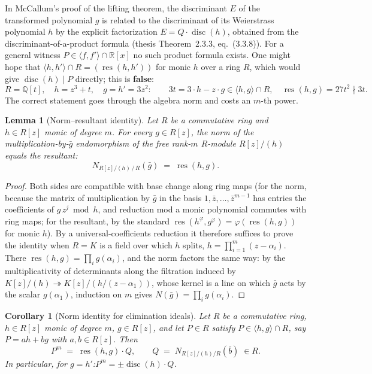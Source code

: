 \documentclass[11pt,a4paper]{article}
\theoremstyle{plain}
\newtheorem{lemma}[theorem]{Lemma}
\newtheorem{corollary}[theorem]{Corollary}
\theoremstyle{definition}
\newcommand{\R}{\mathbb{R}}
\DeclareMathOperator{\res}{res}
\DeclareMathOperator{\disc}{disc}
\newcommand{\ideal}[1]{\langle #1\rangle}
\begin{document}
In McCallum's proof of the lifting theorem, the discriminant $E$ of the
transformed polynomial $g$ is related to the discriminant of its Weierstrass
polynomial $h$ by the explicit factorization $E=Q\cdot\disc(h)$, obtained from
the discriminant-of-a-product formula (thesis Theorem~2.3.3, eq.~(3.3.8)). For
a general witness $P\in\ideal{f,f'}\cap\R[x]$ no such product formula exists.
One might hope that $\ideal{h,h'}\cap R=(\res(h,h'))$ for monic $h$ over a
ring $R$, which would give $\disc(h)\mid P$ directly; this is \textbf{false}:
\begin{equation}\label{eq:counterexample}
  R=\mathbb{Q}[t],\quad h=z^3+t,\quad g=h'=3z^2:\qquad
  3t = 3\cdot h - z\cdot g\in\ideal{h,g}\cap R,\quad
  \res(h,g)=27t^2\nmid 3t .
\end{equation}
The correct statement goes through the algebra norm and costs an $m$-th power.

\begin{lemma}[Norm--resultant identity]\label{lem:norm-res}
Let $R$ be a commutative ring and $h\in R[z]$ monic of degree $m$. For every
$g\in R[z]$, the norm of the multiplication-by-$\bar g$ endomorphism of the
free rank-$m$ $R$-module $R[z]/(h)$ equals the resultant:
\[
  N_{R[z]/(h)\,/\,R}(\bar g)\;=\;\res(h,g).
\]
\end{lemma}

\begin{proof}
Both sides are compatible with base change along ring maps (for the norm,
because the matrix of multiplication by $\bar g$ in the basis
$1,\bar z,\dots,\bar z^{m-1}$ has entries the coefficients of
$g\,z^j \bmod h$, and reduction mod a monic polynomial commutes with ring
maps; for the resultant, by the standard $\res(h^\varphi,g^\varphi)
=\varphi(\res(h,g))$ for monic $h$). By a universal-coefficients reduction it
therefore suffices to prove the identity when $R=K$ is a field over which $h$
splits, $h=\prod_{i=1}^m(z-\alpha_i)$. There
$\res(h,g)=\prod_i g(\alpha_i)$, and the norm factors the same way: by the
multiplicativity of determinants along the filtration induced by
$K[z]/(h)\twoheadrightarrow K[z]/(h/(z-\alpha_1))$, whose kernel is a line on
which $\bar g$ acts by the scalar $g(\alpha_1)$, induction on $m$ gives
$N(\bar g)=\prod_i g(\alpha_i)$.
\end{proof}

\begin{corollary}[Norm identity for elimination ideals]\label{cor:norm-elim}
Let $R$ be a commutative ring, $h\in R[z]$ monic of degree $m$, $g\in R[z]$,
and let $P\in R$ satisfy $P\in\ideal{h,g}\cap R$, say $P=ah+bg$ with
$a,b\in R[z]$. Then
\[
  P^{m} \;=\; \res(h,g)\cdot Q,
  \qquad Q \;=\; N_{R[z]/(h)/R}(\bar b)\;\in R .
\]
In particular, for $g=h'$:\quad $P^{m}=\pm\disc(h)\cdot Q$.
\end{corollary}
\end{document}
